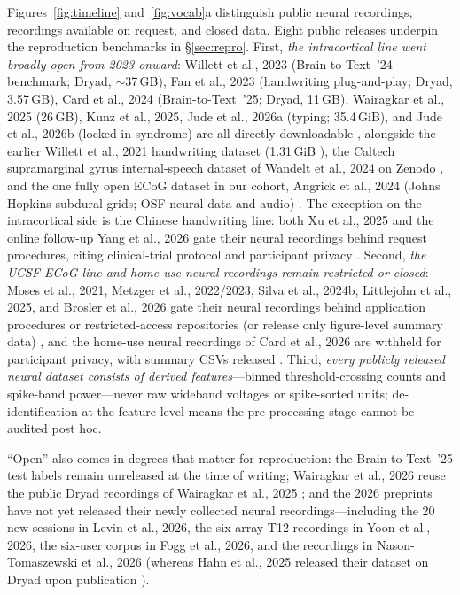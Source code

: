 \documentclass[11pt]{article}
\begin{document}
Figures~\ref{fig:timeline} and~\ref{fig:vocab}a distinguish public
neural recordings, recordings available on request, and closed data.
Eight public releases underpin the reproduction benchmarks in
\S\ref{sec:repro}. First, \emph{the intracortical line went
broadly open from 2023 onward}: Willett et al., 2023 (Brain-to-Text~'24
benchmark; Dryad, $\sim$37\,GB), Fan et al., 2023 (handwriting
plug-and-play; Dryad, 3.57\,GB), Card et al., 2024 (Brain-to-Text~'25;
Dryad, 11\,GB), Wairagkar et al., 2025 (26\,GB), Kunz et al., 2025,
Jude et al., 2026a (typing; 35.4\,GiB), and Jude et al., 2026b
(locked-in syndrome) are all directly downloadable
\cite{card2024, willett2023, wairagkar2025, jude2026lis, jude2026typing, fan2023, kunz2025}, alongside the earlier Willett et al., 2021
handwriting dataset (1.31\,GiB \cite{willett2021}), the Caltech
supramarginal gyrus internal-speech dataset of Wandelt et al., 2024 on
Zenodo \cite{wandelt2024}, and the one fully open ECoG dataset in our
cohort, Angrick et al., 2024 (Johns Hopkins subdural grids; OSF neural
data and audio) \cite{angrick2024}. The exception on the intracortical
side is the Chinese handwriting line: both Xu et al., 2025 and the
online follow-up Yang et al., 2026 gate their neural recordings behind
request procedures, citing clinical-trial protocol and participant
privacy \cite{xu2025, yang2026}. Second, \emph{the UCSF ECoG line and
home-use neural recordings remain restricted or closed}: Moses et al.,
2021, Metzger et al., 2022/2023, Silva et al., 2024b, Littlejohn et al.,
2025, and Brosler et al., 2026 gate their neural recordings behind
application procedures or restricted-access repositories (or release
only figure-level summary data)
\cite{moses2021, metzger2023, metzger2022, littlejohn2025, brosler2026, silva2024}, and the home-use neural recordings of Card
et al., 2026 are withheld for participant privacy, with summary CSVs
released \cite{card2026}. Third, \emph{every publicly released neural
dataset consists of derived features}---binned threshold-crossing counts
and spike-band power---never raw wideband voltages or spike-sorted
units; de-identification at the feature level means the pre-processing
stage cannot be audited post hoc.

``Open'' also comes in degrees that matter for reproduction: the
Brain-to-Text~'25 test labels remain unreleased at the time of writing;
Wairagkar et al., 2026 reuse the public Dryad recordings of Wairagkar et
al., 2025 \cite{wairagkar2026}; and the 2026 preprints have not yet
released their newly collected neural recordings---including the 20 new
sessions in Levin et al., 2026, the six-array T12 recordings in Yoon et
al., 2026, the six-user corpus in Fogg et al., 2026, and the recordings
in Nason-Tomaszewski et al., 2026
\cite{fogg2026, yoon2026, levin2026, nason2026} (whereas Hahn et al., 2025
released their dataset on Dryad upon publication \cite{hahn2025}).
\end{document}
